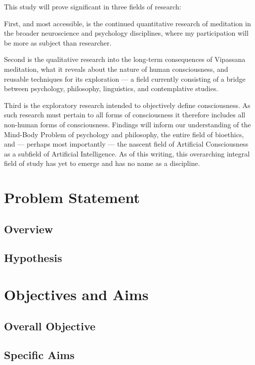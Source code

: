 \documentclass[a4paper, amsfonts, amssymb, amsmath, reprint, showkeys, nofootinbib, twoside]{revtex4-1}
\begin{document}
This study will prove significant in three fields of research:

First, and most accessible, is the continued quantitative research of meditation in
the broader neuroscience and psychology disciplines, where my participation will be
more as subject than researcher.

Second is the qualitative research into the long-term consequences of
Vipassana meditation, what it reveals about the nature of human consciousness, and
reusable techniques for its exploration --- a field currently consisting of a bridge
between psychology, philosophy, linguistics, and contemplative studies.

Third is the exploratory research intended to objectively define
consciousness. As such research must pertain to all forms of consciousness it
therefore includes all non-human forms of consciousness. Findings will inform our
understanding of the Mind-Body Problem of psychology and philosophy, the entire field
of bioethics, and --- perhaps most importantly --- the nascent field of Artificial
Consciousness as a subfield of Artificial Intelligence. \cite{hildt2019artificial} As of this
writing, this overarching integral field of study has yet to emerge and has no name
as a discipline.

\section{Problem Statement}

\subsection{Overview}

\subsection{Hypothesis}

\section{Objectives and Aims}

\subsection{Overall Objective}
\subsection{Specific Aims}
\end{document}
